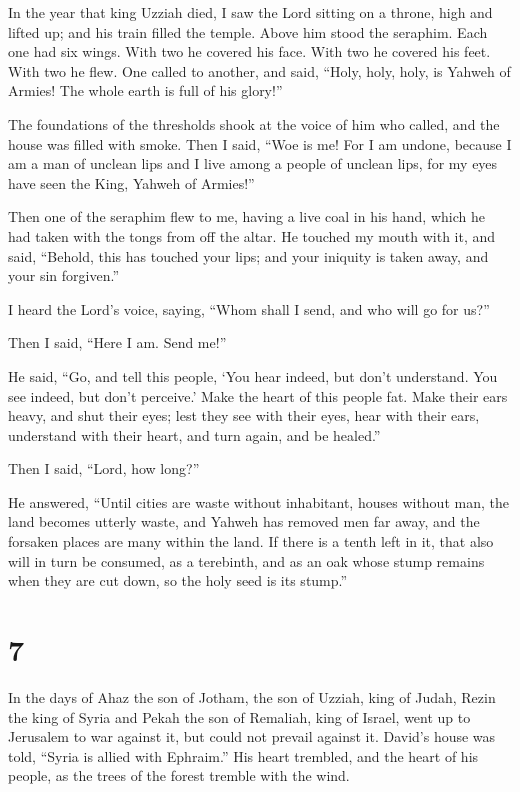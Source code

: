  In the year that king Uzziah died, I saw the Lord sitting
on a throne, high and lifted up; and his train filled the temple.
 Above him stood the seraphim. Each one had six wings. With
two he covered his face. With two he covered his feet. With two he flew.
 One called to another, and said, ``Holy, holy, holy, is
Yahweh of Armies! The whole earth is full of his glory!''

 The foundations of the thresholds shook at the voice of him
who called, and the house was filled with smoke.  Then I
said, ``Woe is me! For I am undone, because I am a man of unclean lips
and I live among a people of unclean lips, for my eyes have seen the
King, Yahweh of Armies!''

 Then one of the seraphim flew to me, having a live coal in
his hand, which he had taken with the tongs from off the altar.
 He touched my mouth with it, and said, ``Behold, this has
touched your lips; and your iniquity is taken away, and your sin
forgiven.''

 I heard the Lord's voice, saying, ``Whom shall I send, and
who will go for us?''

Then I said, ``Here I am. Send me!''

 He said, ``Go, and tell this people, `You hear indeed, but
don't understand. You see indeed, but don't perceive.' 
Make the heart of this people fat. Make their ears heavy, and shut their
eyes; lest they see with their eyes, hear with their ears, understand
with their heart, and turn again, and be healed.''

 Then I said, ``Lord, how long?''

He answered, ``Until cities are waste without inhabitant, houses without
man, the land becomes utterly waste,  and Yahweh has
removed men far away, and the forsaken places are many within the land.
 If there is a tenth left in it, that also will in turn be
consumed, as a terebinth, and as an oak whose stump remains when they
are cut down, so the holy seed is its stump.''

\hypertarget{section-6}{%
\section{7}\label{section-6}}

 In the days of Ahaz the son of Jotham, the son of Uzziah,
king of Judah, Rezin the king of Syria and Pekah the son of Remaliah,
king of Israel, went up to Jerusalem to war against it, but could not
prevail against it.  David's house was told, ``Syria is
allied with Ephraim.'' His heart trembled, and the heart of his people,
as the trees of the forest tremble with the wind.

